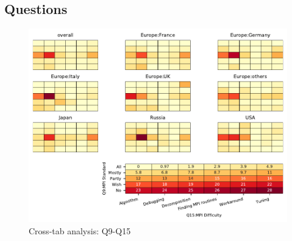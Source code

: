 
\subsection{Questions}


\begin{figure}
\begin{center}
\includegraphics[width=12cm]{../pdfs/Q9-Q15.pdf}
\caption{Cross-tab analysis: Q9-Q15}
\label{fig:Q9-Q15}
\end{center}
\end{figure}
